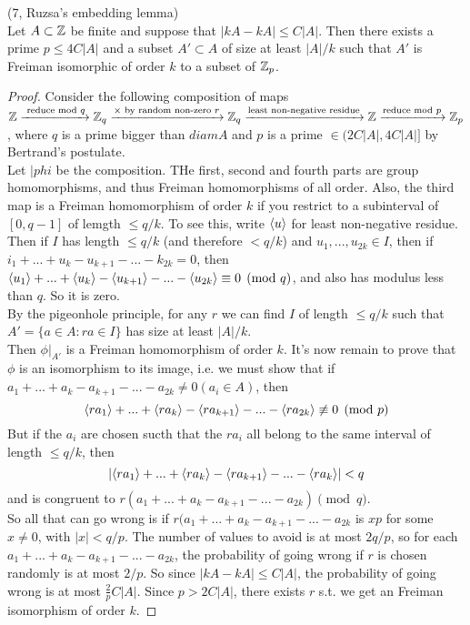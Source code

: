 \documentclass[a4paper]{article}
\begin{document}
\begin{lemma} (7, Ruzsa's embedding lemma)\\
    Let $A \subset \mathbb{Z}$ be finite and suppose that $|kA-kA| \leq C|A|$. Then there exists a prime $p \leq 4C|A|$ and a subset $A'\subset A$ of size at least $|A|/k$ such that $A'$ is Freiman isomorphic of order $k$ to a subset of $\mathbb{Z}_p$.
    \begin{proof}
        Consider the following composition of maps $\mathbb{Z} \xrightarrow{\text{ reduce mod }q}\mathbb{Z}_q \xrightarrow{\times \text{ by random non-zero } r} \mathbb{Z}_q \xrightarrow{\text{least non-negative residue}} \mathbb{Z} \xrightarrow{\text{reduce mod }p} \mathbb{Z}_p$, where $q$ is a prime bigger than $diam A$ and $p$ is a prime $\in (2C|A|,4C|A|]$ by Bertrand's postulate.\\
        Let $|phi$ be the composition. THe first, second and fourth parts are group homomorphisms, and thus Freiman homomorphisms of all order. Also, the third map is a Freiman homomorphism of order $k$ if you restrict to a subinterval of $[0,q-1]$ of lemgth $\leq q/k$. To see this, write $\langle u \rangle$ for least non-negative residue. Then if $I$ has length $\leq q/k$ (and therefore $<q/k$) and $u_{1},...,u_{2k} \in I$, then if $i_1+...+u_k-u_{k+1}-...-k_{2k} = 0$, then $\langle u_1 \rangle + ... + \langle u_k \rangle - \langle u_{k+1} \rangle - ... - \langle u_{2k} \rangle \equiv 0 \pmod q$, and also has modulus less than $q$. So it is zero.\\
        By the pigeonhole principle, for any $r$ we can find $I$ of length $\leq q/k$ such that $A' = \{a \in A: ra \in I\}$ has size at least $|A| / k$.\\
        Then $\phi|_{A'}$ is a Freiman homomorphism of order $k$. It's now remain to prove that $\phi$ is an isomorphism to its image, i.e. we must show that if $a_1+...+a_k-a_{k+1}-...-a_{2k} \neq 0 (a_i \in A)$, then
        $$ \langle ra_1\rangle + ... + \langle ra_k\rangle - \langle ra_{k+1} \rangle - ... - \langle ra_{2k} \rangle \not\equiv 0 \pmod p$$
        But if the $a_i$ are chosen sucth that the $ra_i$ all belong to the same interval of length $\leq q/k$, then 
        $$|\langle ra_1\rangle + ... + \langle ra_k\rangle - \langle ra_{k+1} \rangle - ... - \langle ra_k\rangle| < q$$
        and is congruent to $r(a_1+...+a_k-a_{k+1}-...-a_{2k}) \pmod q$.\\
        So all that can go wrong is if $r(a_1+...+a_k-a_{k+1} - ... - a_{2k}$ is $xp$ for some $x \neq 0$, with $|x| < q/p$. The number of values to avoid is at most $2q/p$, so for each $a_1+...+a_k-a_{k+1} - ... - a_{2k}$, the probability of going wrong if $r$ is chosen randomly is at most $2/p$. So since $|kA-kA| \leq C|A|$, the probability of going wrong is at most $\frac{2}{p} C|A|$. Since $p > 2C|A|$, there exists $r$ s.t. we get an Freiman isomorphism of order $k$.
    \end{proof}
\end{lemma}
\end{document}
